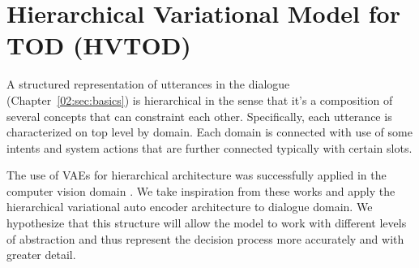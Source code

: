 \section{Hierarchical Variational Model for TOD (HVTOD)}
A structured representation of utterances in the dialogue (Chapter~\ref{02:sec:basics}) is hierarchical in the sense that it's a composition of several concepts that can constraint each other.
Specifically, each utterance is characterized on top level by domain.
Each domain is connected with use of some intents and system actions that are further connected typically with certain slots.

The use of VAEs for hierarchical architecture was successfully applied in the computer vision domain \cite{vahdat2020nvae,li2020progressive}.
We take inspiration from these works and apply the hierarchical variational auto encoder architecture to dialogue domain.
We hypothesize that this structure will allow the model to work with different levels of abstraction and thus represent the decision process more accurately and with greater detail.

